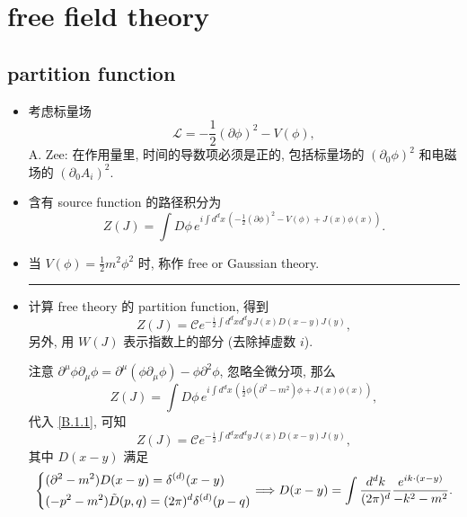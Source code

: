 \chapter{free field theory}
\section{partition function}
\begin{itemize}
	\item 考虑标量场
	\begin{equation}
		\mathcal{L} = - \frac{1}{2} (\partial \phi)^2 - V(\phi),
	\end{equation}
	A. Zee: 在作用量里, 时间的导数项必须是正的, 包括标量场的 $(\partial_0 \phi)^2$ 和电磁场的 $(\partial_0 A_i)^2$.
	
	\item 含有 source function 的路径积分为
	\begin{equation}
		Z(J) = \int D\phi \, e^{i \int d^d x \, (- \frac{1}{2} (\partial \phi)^2 - V(\phi) + J(x) \phi(x))}.
	\end{equation}
	
	\item 当 $V(\phi) = \frac{1}{2} m^2 \phi^2$ 时, 称作 free or Gaussian theory.
	
	\noindent\rule[0.5ex]{\linewidth}{0.5pt} %
	
	\item 计算 free theory 的 partition function, 得到
	\begin{equation} \label{1.1.3}
		Z(J) = \mathcal{C} e^{- \frac{i}{2} \int d^d x d^d y \, J(x) D(x - y) J(y)},
	\end{equation}
	另外, 用 $W(J)$ 表示指数上的部分 (去除掉虚数 $i$).
	
	\begin{tcolorbox}[title=proof:]
		注意 $\partial^\mu \phi \partial_\mu \phi = \partial^\mu(\phi \partial_\mu \phi) - \phi \partial^2 \phi$, 忽略全微分项, 那么
		\begin{equation} \label{1.1.4}
			Z(J) = \int D\phi \, e^{i \int d^d x \, (\frac{1}{2} \phi (\partial^2 - m^2) \phi + J(x) \phi(x))},
		\end{equation}
		代入 \eqref{B.1.1}, 可知
		\begin{equation}
			Z(J) = \mathcal{C} e^{- \frac{i}{2} \int d^d x d^d y \, J(x) D(x - y) J(y)},
		\end{equation}
		其中 $D(x - y)$ 满足
		\begin{equation} \label{1.1.6}
			\begin{dcases}
				(\partial^2 - m^2) D(x - y) = \delta^{(d)}(x - y) \\
				(- p^2 - m^2) \tilde{D}(p, q) = (2 \pi)^d \delta^{(d)}(p - q)
			\end{dcases} \Longrightarrow D(x - y) = \int \frac{d^d k}{(2 \pi)^d} \frac{e^{i k \cdot (x - y)}}{- k^2 - m^2}.
		\end{equation}
	\end{tcolorbox}
\end{itemize}

